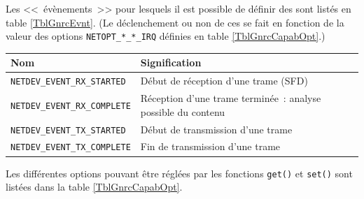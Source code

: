 Les <<~évènements~>> pour lesquels il est possible de définir des
 sont listés en table \vref{TblGnrcEvnt}.
(Le déclenchement ou non de ces  se fait en fonction
de la valeur des options \texttt{NETOPT\_*\_*\_IRQ} définies en table
\vref{TblGnrcCapabOpt}.)


\begin{table}[!htb]
\centering

\begin{tabular}{|l|p{8cm}|}
\hline
\textbf{Nom} & \textbf{Signification} \\
\hline
\texttt{NETDEV\_EVENT\_RX\_STARTED} & Début de réception d'une trame (SFD) \\
\hline
\texttt{NETDEV\_EVENT\_RX\_COMPLETE} & Réception d'une trame terminée~:
                                       analyse possible du contenu \\
\hline
\texttt{NETDEV\_EVENT\_TX\_STARTED} & Début de transmission d'une trame \\
\hline
\texttt{NETDEV\_EVENT\_TX\_COMPLETE} & Fin de transmission d'une trame \\
\hline
\end{tabular}

\label{TblGnrcEvnt}
\end{table}


Les différentes options pouvant être réglées par les fonctions \texttt{get()}
et \texttt{set()} sont listées dans la table \vref{TblGnrcCapabOpt}.


